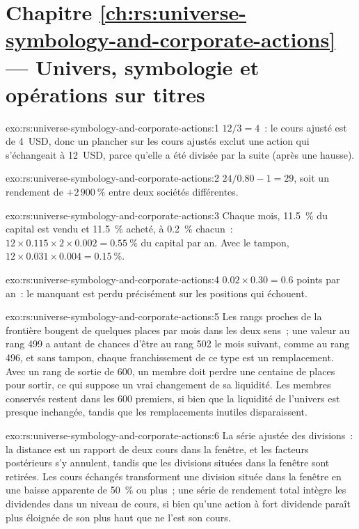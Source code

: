 \section*{Chapitre \ref{ch:rs:universe-symbology-and-corporate-actions} --- Univers, symbologie et opérations sur titres}

\begin{solution}{exo:rs:universe-symbology-and-corporate-actions:1}
$12/3 = 4$~: le cours ajusté est de 4~USD, donc un plancher sur les cours ajustés exclut une action qui s'échangeait à 12~USD, parce qu'elle
a été divisée par la suite (après une hausse).
\end{solution}

\begin{solution}{exo:rs:universe-symbology-and-corporate-actions:2}
$24/0.80 - 1 = 29$, soit un rendement de $+2\,900~\%$ entre deux sociétés différentes.
\end{solution}

\begin{solution}{exo:rs:universe-symbology-and-corporate-actions:3}
Chaque mois, 11.5~\% du capital est vendu et 11.5~\% acheté, à 0.2~\% chacun~: $12 \times 0.115 \times 2 \times 0.002 = 0.55~\%$ du capital par
an. Avec le tampon, $12 \times 0.031 \times 0.004 = 0.15~\%$.
\end{solution}

\begin{solution}{exo:rs:universe-symbology-and-corporate-actions:4}
$0.02 \times 0.30 = 0.6$ points par an~: le  manquant est perdu précisément sur les positions qui échouent.
\end{solution}

\begin{solution}{exo:rs:universe-symbology-and-corporate-actions:5}
Les rangs proches de la frontière bougent de quelques places par mois dans les deux sens~; une valeur au rang 499 a autant de chances d'être au rang 502 le mois suivant, comme
au rang 496, et sans tampon, chaque franchissement de ce type est un remplacement. Avec un rang de sortie de 600, un membre doit perdre une centaine de places pour
sortir, ce qui suppose un vrai changement de sa liquidité. Les membres conservés restent dans les 600 premiers, si bien que la liquidité de l'univers est presque
inchangée, tandis que les remplacements inutiles disparaissent.
\end{solution}

\begin{solution}{exo:rs:universe-symbology-and-corporate-actions:6}
La série ajustée des divisions~: la distance est un rapport de deux cours dans la fenêtre, et les facteurs postérieurs s'y annulent, tandis que les divisions situées
dans la fenêtre sont retirées. Les cours échangés transforment une division située dans la fenêtre en une baisse apparente de 50~\% ou plus~; une série de rendement total
intègre les dividendes dans un niveau de cours, si bien qu'une action à fort dividende paraît plus éloignée de son plus haut que ne l'est son cours.
\end{solution}

